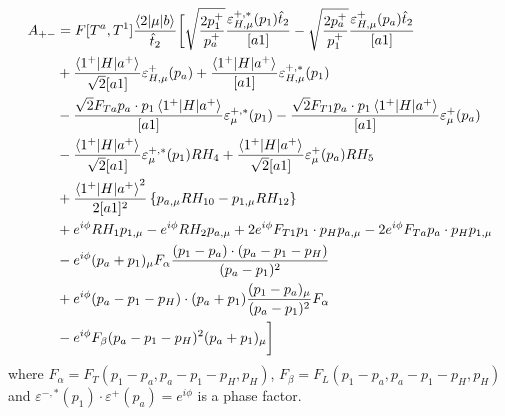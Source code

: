 \begin{equation}
\begin{split}
A_{+-} &=F[T^a,T^1]\frac{\mathinner{\langle2\vert\mu\vert b\rangle}_{}}{\hat{t}_2} \bigg[\sqrt{\frac{2p_1^+}{p_a^+}}\frac{\varepsilon_{H,\mu}^{+,*}(p_1) \hat{t}_2}{[a1]} - \sqrt{\frac{2p_a^+}{p_1^+}}\frac{\varepsilon_{H,\mu}^{+}(p_a)\hat{t}_2}{[a1]} \\
&+ \frac{\mathinner{\langle1^+\vert H\vert a^+\rangle}_{}}{\sqrt{2}[a1]}\varepsilon_{H,\mu}^+(p_a) + \frac{\mathinner{\langle1^+\vert H\vert a^+\rangle}_{}}{[a 1]}\varepsilon^{+,*}_{H,\mu}(p_1) \\
&- \frac{\sqrt{2} F_{Ta} p_a \cdot p_1 \mathinner{\langle1^+\vert H\vert a^+\rangle}_{}}{[a1]}\varepsilon^{+,*}_\mu (p_1) - \frac{\sqrt{2} F_{T1} p_a \cdot p_1 \mathinner{\langle1^+\vert H\vert a^+\rangle}_{}}{[a1]}\varepsilon^+_\mu (p_a)  \\ 
& -\frac{\mathinner{\langle1^+\vert H\vert a^+\rangle}_{}}{\sqrt{2} [a1]} \varepsilon^{+,*}_\mu(p_1) R H_4 + \frac{\mathinner{\langle1^+\vert H\vert a^+\rangle}_{}}{\sqrt{2} [a1]} \varepsilon^{+}_\mu(p_a)R H_5 \\
 &+ \frac{\mathinner{\langle1^+\vert H\vert a^+\rangle}_{}^2}{2 [a 1]^2}\left \{ p_{a,\mu} R H_{10} - p_{1,\mu}RH_{12}\right \} \\
 &+ e^{i \phi} R H_1 p_{1,\mu} - e^{i \phi} R H_2 p_{a,\mu} + 2 e^{i \phi} F_{T1} p_1\cdot p_H p_{a,\mu} - 2 e^{i \phi}F_{Ta} p_a \cdot p_H p_{1,\mu} \\
 &- e^{i \phi} (p_a + p_1)_\mu F_{\alpha} \frac{(p_1-p_a)\cdot(p_a-p_1-p_H)}{(p_a-p_1)^2} \\
 &+ e^{i \phi} (p_a - p_1 - p_H) \cdot (p_a + p_1) \frac{(p_1-p_a)_\mu}{(p_a-p_1)^2} F_\alpha \\
 &- e^{i \phi} F_\beta (p_a-p_1-p_H)^2 (p_a + p_1)_\mu 
  \bigg]
\end{split}
\end{equation}
where $F_\alpha = F_T(p_1-p_a,p_a-p_1-p_H,p_H)$, $F_\beta = F_L(p_1-p_a,p_a-p_1-p_H,p_H)$ and $\varepsilon^{-,*}(p_1) \cdot \varepsilon^+(p_a) = e^{i \phi}$ is a phase factor. 

